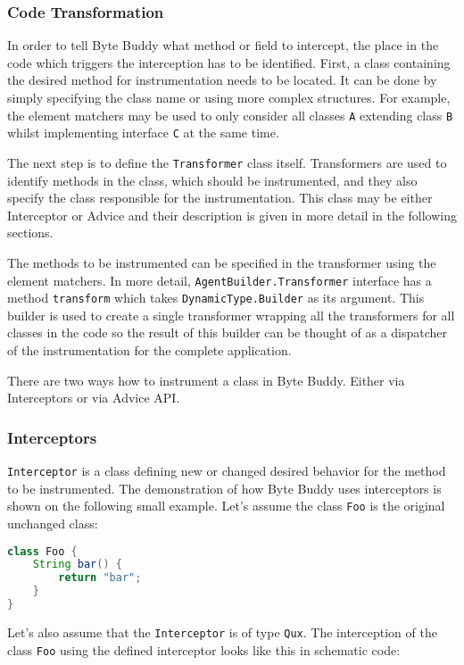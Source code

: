 \subsubsection{Code Transformation}
\label{back:code_transform}
In order to tell Byte Buddy what method or field to intercept, the place in the code which triggers the interception has to be identified. First, a class containing the desired method for instrumentation needs to be located. It can be done by simply specifying the class name or using more complex structures. For example, the element matchers may be used to only consider all classes \texttt{A} extending class \texttt{B} whilst implementing interface \texttt{C} at the same time. 

The next step is to define the \texttt{Transformer} class itself. Transformers are used to identify methods in the class, which should be instrumented, and they also specify the class responsible for the instrumentation. This class may be either Interceptor or Advice and their description is given in more detail in the following sections. 

The methods to be instrumented can be specified in the transformer using the element matchers. In more detail, \texttt{AgentBuilder.Transformer} interface has a method \texttt{transform} which takes \texttt{DynamicType.Builder} as its argument. This builder is used to create a single transformer wrapping all the transformers for all classes in the code so the result of this builder can be thought of as a dispatcher of the instrumentation for the complete application.

There are two ways how to instrument a class in Byte Buddy. Either via Interceptors or via Advice API.
\subsubsection{Interceptors}
\texttt{Interceptor} is a class defining new or changed desired behavior for the method to be instrumented.  The demonstration of how Byte Buddy uses interceptors is shown on the following small example. Let's assume the class \texttt{Foo} is the original unchanged class:
\begin{lstlisting}[language=Java]
class Foo {
	String bar() {
		return "bar"; 
	}
}
\end{lstlisting}
	
Let's also assume that the \texttt{Interceptor} is of type \texttt{Qux}. The interception of the class \texttt{Foo} using the defined interceptor looks like this in schematic code:

